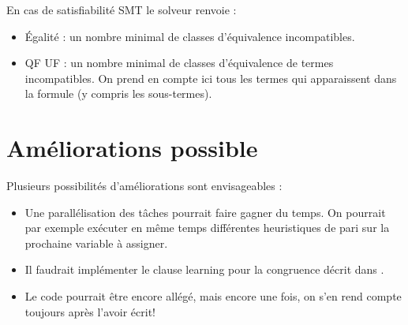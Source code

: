 \documentclass{article}
\begin{document}
En cas de satisfiabilité SMT le solveur renvoie : 
\begin{itemize}
\item Égalité : un nombre minimal de classes d'équivalence incompatibles.
\item QF UF : un nombre minimal de classes d'équivalence de termes incompatibles. On prend en compte ici tous les termes qui apparaissent dans la formule (y compris les sous-termes).

\end{itemize}

\section{Améliorations possible}
Plusieurs possibilités d'améliorations sont envisageables : 
\begin{itemize}
\item Une parallélisation des tâches pourrait faire gagner du temps. On pourrait par exemple exécuter en même temps différentes heuristiques de pari sur la prochaine variable à assigner.
\item Il faudrait implémenter le clause learning pour la congruence décrit dans \cite{SMT}.
\item Le code pourrait être encore allégé, mais encore une fois, on s'en rend compte toujours après l'avoir écrit!
\end{itemize}



\end{document}

